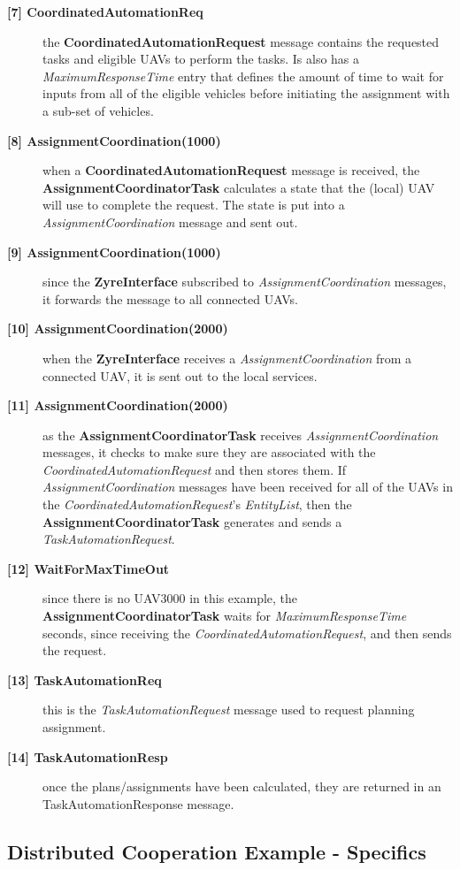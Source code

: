 \begin{description}
	\item[\textbf{[7] CoordinatedAutomationReq}] the \textbf{CoordinatedAutomationRequest} message contains the requested tasks and eligible UAVs to perform the tasks. Is also has a \textit{MaximumResponseTime} entry that defines the amount of time to wait for inputs from all of the eligible vehicles before initiating the assignment with a sub-set of vehicles.
	\item[\textbf{[8] AssignmentCoordination(1000)}] when a \textbf{CoordinatedAutomationRequest} message is received, the \textbf{AssignmentCoordinatorTask} calculates a state that the (local) UAV will use to complete the request. The state is put into a \textit{AssignmentCoordination} message and sent out.
	\item[\textbf{[9] AssignmentCoordination(1000)}] since the \textbf{ZyreInterface} subscribed to \textit{AssignmentCoordination} messages, it forwards the message to all connected UAVs.
	\item[\textbf{[10] AssignmentCoordination(2000)}] when the \textbf{ZyreInterface} receives a \textit{AssignmentCoordination} from a connected UAV, it is sent out to the local services.
	\item[\textbf{[11] AssignmentCoordination(2000)}] as the \textbf{AssignmentCoordinatorTask} receives \textit{AssignmentCoordination} messages, it checks to make sure they are associated with the \textit{CoordinatedAutomationRequest} and then stores them. If \textit{AssignmentCoordination} messages have been received for all of the UAVs in the \textit{CoordinatedAutomationRequest}'s \textit{EntityList}, then the \textbf{AssignmentCoordinatorTask} generates and sends a \textit{TaskAutomationRequest}.
	\item[\textbf{[12] WaitForMaxTimeOut}] since there is no UAV3000 in this example, the \textbf{AssignmentCoordinatorTask} waits for \textit{MaximumResponseTime} seconds, since receiving the \textit{CoordinatedAutomationRequest}, and then sends the request.
	\item[\textbf{[13] TaskAutomationReq}] this is the \textit{TaskAutomationRequest} message used to request planning assignment.
	\item[\textbf{[14] TaskAutomationResp}] once the plans/assignments have been calculated, they are returned in an TaskAutomationResponse message.

\end{description}


\subsection{Distributed Cooperation Example - Specifics}

